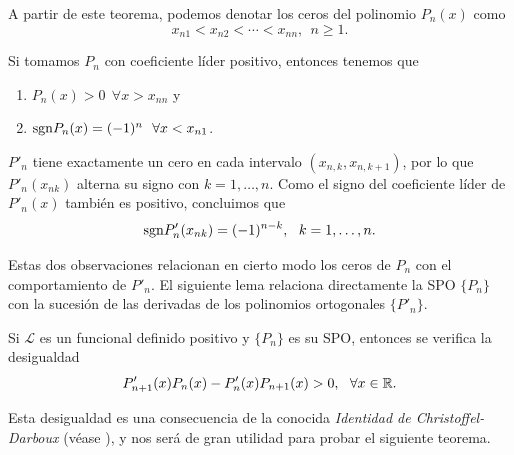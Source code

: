 A partir de este teorema, podemos denotar los ceros del polinomio $P_n(x)$ como
$$
x_{n1} < x_{n2} < \cdots < x_{nn}, \ \ n\geq 1.
$$

\begin{observacion}
    Si tomamos $P_n$ con coeficiente líder positivo, entonces tenemos que 
    \begin{enumerate}
        \item $P_n(x) > 0 \ \ \forall x>x_{nn}$ y 
        \item $\mathrm{sgn} P_n(x) = (-1)^{n}  \ \ \forall x<x_{n1}$.
    \end{enumerate}
\end{observacion}

\begin{observacion}
    $P'_n$ tiene exactamente un cero en cada intervalo $(x_{n,k},x_{n,k+1})$, por lo que $P'_n(x_{nk})$ alterna su signo con $k=1,\dots ,n$. Como el signo del coeficiente líder de $P'_n(x)$ también es positivo, concluimos que
    \begin{equation}
        \label{eq:signo-derivada}
        \mathrm{sgn} P'_n(x_{nk}) =(-1)^{n-k}, \ \ k = 1,\dots, n.
    \end{equation}
    

\end{observacion}

Estas dos observaciones relacionan en cierto modo los ceros de $P_n$ con el comportamiento de $P'_n$. El siguiente lema relaciona directamente la SPO $\{P_n\}$ con la sucesión de las derivadas de los polinomios ortogonales $\{P'_n\}$. 

\begin{lema}
    Si $\mathcal{L}$ es un funcional definido positivo y $\{P_n\}$ es su SPO, entonces se verifica la desigualdad
    \begin{equation}
        \label{eq:desigualdad-cd}
        P'_{n+1}(x)P_n(x) -P'_n(x)P_{n+1}(x) > 0, \ \ \forall x\in\mathbb{R}.
    \end{equation}
\end{lema}

Esta desigualdad es una consecuencia de la conocida \textit{Identidad de Christoffel-Darboux} (véase \cite[Theorem 4.5]{chihara}), y nos será de gran utilidad para probar el siguiente teorema.

